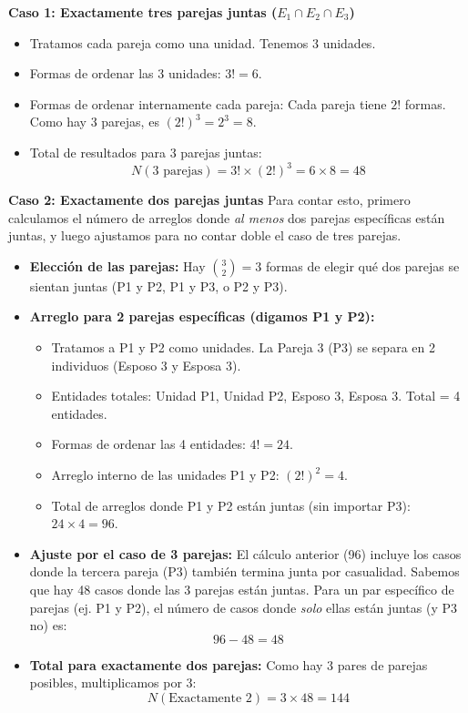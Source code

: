 \documentclass[a4paper]{article}
\begin{document}
\textbf{Caso 1: Exactamente tres parejas juntas ($E_1 \cap E_2 \cap E_3$)}
\begin{itemize}
    \item Tratamos cada pareja como una unidad. Tenemos 3 unidades.
    \item Formas de ordenar las 3 unidades: $3! = 6$.
    \item Formas de ordenar internamente cada pareja: Cada pareja tiene $2!$ formas. Como hay 3 parejas, es $(2!)^3 = 2^3 = 8$.
    \item Total de resultados para 3 parejas juntas:
    $$ N(3 \text{ parejas}) = 3! \times (2!)^3 = 6 \times 8 = 48 $$
\end{itemize}

\textbf{Caso 2: Exactamente dos parejas juntas}
Para contar esto, primero calculamos el número de arreglos donde \textit{al menos} dos parejas específicas están juntas, y luego ajustamos para no contar doble el caso de tres parejas.

\begin{itemize}
    \item \textbf{Elección de las parejas:} Hay $\binom{3}{2} = 3$ formas de elegir qué dos parejas se sientan juntas (P1 y P2, P1 y P3, o P2 y P3).
    \item \textbf{Arreglo para 2 parejas específicas (digamos P1 y P2):}
    \begin{itemize}
        \item Tratamos a P1 y P2 como unidades. La Pareja 3 (P3) se separa en 2 individuos (Esposo 3 y Esposa 3).
        \item Entidades totales: Unidad P1, Unidad P2, Esposo 3, Esposa 3. Total = 4 entidades.
        \item Formas de ordenar las 4 entidades: $4! = 24$.
        \item Arreglo interno de las unidades P1 y P2: $(2!)^2 = 4$.
        \item Total de arreglos donde P1 y P2 están juntas (sin importar P3): $24 \times 4 = 96$.
    \end{itemize}
    \item \textbf{Ajuste por el caso de 3 parejas:}
    El cálculo anterior (96) incluye los casos donde la tercera pareja (P3) también termina junta por casualidad. Sabemos que hay 48 casos donde las 3 parejas están juntas.
    Para un par específico de parejas (ej. P1 y P2), el número de casos donde \textit{solo} ellas están juntas (y P3 no) es:
    $$ 96 - 48 = 48 $$
    \item \textbf{Total para exactamente dos parejas:}
    Como hay 3 pares de parejas posibles, multiplicamos por 3:
    $$ N(\text{Exactamente 2}) = 3 \times 48 = 144 $$
\end{itemize}
\end{document}
